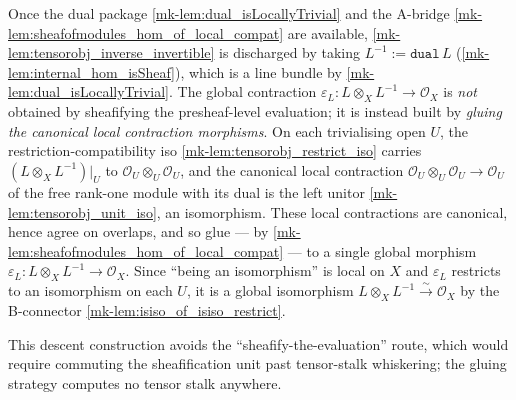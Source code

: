 \begin{remark}
  \label{mk-rem:dual_discharges_inverse}
  Once the dual package \ref{mk-lem:dual_isLocallyTrivial} and the A-bridge
  \ref{mk-lem:sheafofmodules_hom_of_local_compat} are available,
  \ref{mk-lem:tensorobj_inverse_invertible} is discharged by taking \(L^{-1} := \mathtt{dual}\,L\)
  (\ref{mk-lem:internal_hom_isSheaf}), which is a line
  bundle by \ref{mk-lem:dual_isLocallyTrivial}. The global contraction \(\varepsilon_L
  \colon L \otimes_X L^{-1} \to \mathcal{O}_X\) is \emph{not} obtained by sheafifying
  the presheaf-level evaluation; it is instead built by \emph{gluing the canonical local
  contraction morphisms}. On each trivialising open \(U\), the
  restriction-compatibility iso \ref{mk-lem:tensorobj_restrict_iso} carries
  \((L \otimes_X L^{-1})|_U\) to \(\mathcal{O}_U \otimes_U \mathcal{O}_U\), and the
  canonical local contraction \(\mathcal{O}_U \otimes_U \mathcal{O}_U \to \mathcal{O}_U\)
  of the free rank-one module with its dual is the left unitor
  \ref{mk-lem:tensorobj_unit_iso}, an isomorphism. These local contractions are canonical,
  hence agree on overlaps, and so glue --- by
  \ref{mk-lem:sheafofmodules_hom_of_local_compat} --- to a single global morphism
  \(\varepsilon_L \colon L \otimes_X L^{-1} \to \mathcal{O}_X\). Since ``being an
  isomorphism'' is local on \(X\) and \(\varepsilon_L\) restricts to an isomorphism on
  each \(U\), it is a global isomorphism \(L \otimes_X L^{-1} \xrightarrow{\sim}
  \mathcal{O}_X\) by the B-connector \ref{mk-lem:isiso_of_isiso_restrict}.

  This descent construction avoids the ``sheafify-the-evaluation'' route, which would
  require commuting the sheafification unit past tensor-stalk whiskering; the gluing strategy
  computes no tensor stalk anywhere.


\end{remark}
